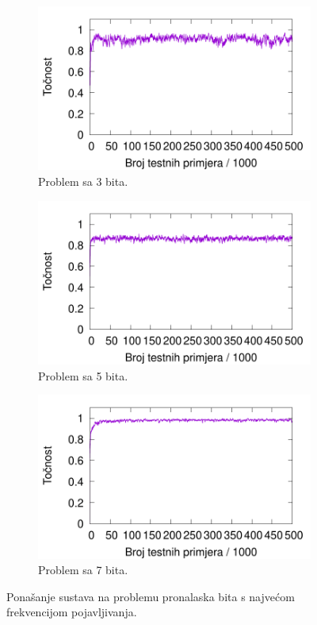 \documentclass[times, utf8, zavrsni]{fer}
\begin{document}
\begin{figure}[h]
    \centering
    \begin{subfigure}{0.496\textwidth}
        \centering
        \includegraphics[width=\textwidth]{img/majority/3majre.pdf}
        \caption{Problem sa 3 bita.}
        \label{fig:3majre}
    \end{subfigure}
    \begin{subfigure}{0.496\textwidth}
        \centering
        \includegraphics[width=\textwidth]{img/majority/5majre.pdf}
        \caption{Problem sa 5 bita.}
        \label{fig:5majre}
    \end{subfigure}
    \begin{subfigure}{0.496\textwidth}
        \centering
        \includegraphics[width=\textwidth]{img/majority/7majre.pdf}
        \caption{Problem sa 7 bita.}
        \label{fig:7majre}
    \end{subfigure}
    \caption{Ponašanje sustava na problemu pronalaska bita s najvećom frekvencijom pojavljivanja.}
    \label{fig:majre}
\end{figure}
\end{document}
